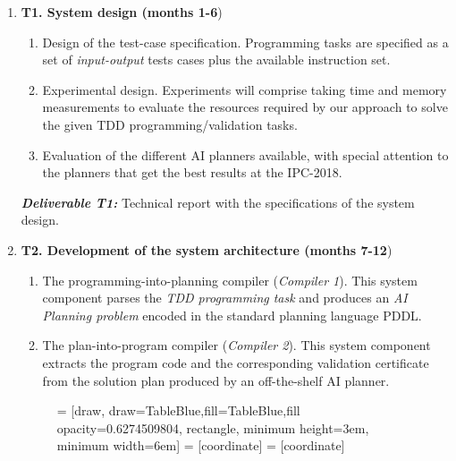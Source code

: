 \documentclass[10pt,a4paper]{paper}
\begin{document}
\begin{enumerate}
\item {\bf T1. System design (months 1-6})
  \begin{small}
    \begin{enumerate}
    \item Design of the test-case specification. Programming tasks are specified as a set of {\em input-output} tests cases plus the available instruction set. 
    \item Experimental design. Experiments will comprise taking time and memory measurements to evaluate the resources required by our approach to solve the given TDD programming/validation tasks.
    \item Evaluation of the different AI planners available, with special attention to the planners that get the best results at the IPC-2018. 
      \end{enumerate}
  \end{small}

{\small{\bf\em  Deliverable T1:} Technical report with the specifications of the system design.}
  
  \item {\bf T2. Development of the system architecture (months 7-12})
    \begin{small}
      \begin{enumerate}
      \item The programming-into-planning compiler ({\em Compiler 1}). This system component parses the {\em TDD programming task} and produces an {\em AI Planning problem} encoded in the standard planning language PDDL.
      \item The plan-into-program compiler ({\em Compiler 2}). This system component extracts the program code and the corresponding validation certificate from the solution plan produced by an off-the-shelf AI planner.
      \end{enumerate}
\end{small}      

\begin{figure}[hbt!]
 = [draw, draw=TableBlue,fill=TableBlue,fill opacity=0.6274509804, rectangle, minimum height=3em, minimum width=6em]
 = [coordinate]
 = [coordinate]
\begin{center}
\end{center}
\end{figure}
\end{enumerate}
\end{document}
